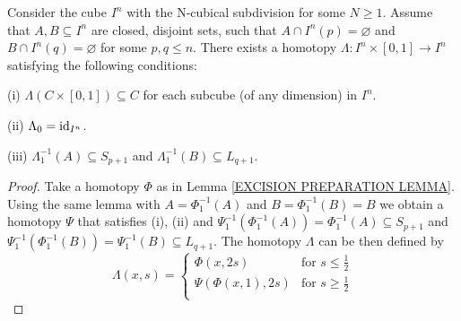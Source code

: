 \begin{corollary}
\label{EXCISION SEPARATION COR}
Consider the cube $I^{n}$ with the N-cubical subdivision for some $N\geq 1$. 
Assume that $A, B\subseteq I^{n}$ are closed, disjoint sets, such that
$A \cap I^{n}(p) = \varnothing$ and $B \cap I^{n}(q) = \varnothing$ for some 
$p, q \leq n$. There exists a homotopy $\Lambda\colon I^{n}\times [0, 1] \to I^{n}$ 
satisfying the following conditions: 
\benu
\item [(i)] $\Lambda(C\times[0, 1]) \subseteq C$ for each subcube 
(of any dimension) in $I^{n}$.
\item [(ii)] $\Lambda_{0} = \mathrm{id}_{I^{n}}$.
\item [(iii)] $\Lambda_{1}^{-1}(A)\subseteq S_{p+1}$ and 
$\Lambda_{1}^{-1}(B) \subseteq L_{q+1}$.
\eenu
\end{corollary}


\begin{proof}
Take a homotopy $\Phi$ as in Lemma \ref{EXCISION PREPARATION LEMMA}.
Using the same lemma with $A = \Phi_{1}^{-1}(A)$ and 
$B  = \Phi_{1}^{-1}(B) = B$  
we obtain a homotopy $\Psi$ that satisfies (i), (ii) and 
$\Psi_{1}^{-1}(\Phi_{1}^{-1}(A)) = \Phi_{1}^{-1}(A) \subseteq S_{p+1}$ 
and $\Psi_{1}^{-1}(\Phi_{1}^{-1}(B)) = \Psi_{1}^{-1}(B) \subseteq L_{q+1}$.
The homotopy $\Lambda$ can be then defined by
\[
\Lambda(x, s) = 
\begin{cases}
\Phi(x, 2s) & \text{for $s \leq \frac{1}{2}$} \\
\Psi(\Phi(x, 1), 2s) & \text{for $s \geq \frac{1}{2}$} \\
\end{cases} 
\]
\end{proof}

